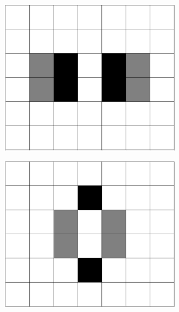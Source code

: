 \documentclass[12pt]{article}
\numberwithin{figure}{section} %
\begin{document}
\begin{figure}[H]
	\begin{subfigure}{0.23\textwidth}
     	\centering
     	\includegraphics[width=\linewidth]{Section4/31.0}
     	\subcaption{}
   	\end{subfigure}
    	\begin{subfigure}{0.23\textwidth}
     	\centering
     	\includegraphics[width=\linewidth]{Section4/31.1}
     	\subcaption{}
   	\end{subfigure}

\end{figure}
\end{document}
